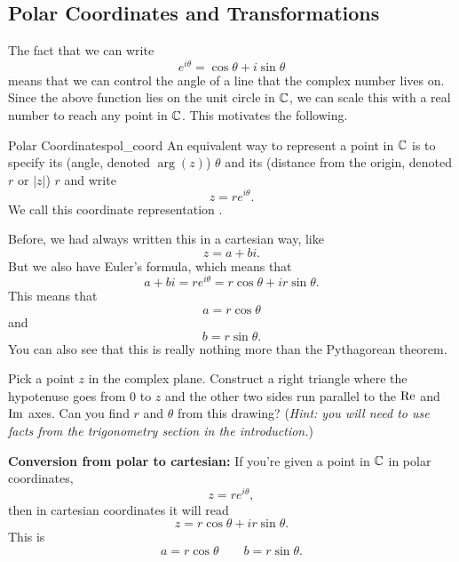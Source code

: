         \subsection{Polar Coordinates and Transformations}
        The fact that we can write
        \[
        e^{i\theta}= \cos \theta + i \sin \theta
        \]
        means that we can control the angle of a line that the complex number lives on.  Since the above function lies on the unit circle in $\mathbb{C}$, we can scale this with a real number to reach any point in $\mathbb{C}$. This motivates the following.
        
        \begin{df}{Polar Coordinates}{pol_coord}
        An equivalent way to represent a point in $\mathbb{C}$ is to specify its  (angle, denoted $\arg(z)$) $\theta$ and its  (distance from the origin, denoted $r$ or $|z|$) $r$ and write
        \[
        z=re^{i\theta}.
        \]
        We call this coordinate representation . 
        \end{df}
        
        Before, we had always written this in a cartesian way, like
        \[
        z=a+bi.
        \]
        But we also have Euler's formula, which means that
        \[
        a+bi = re^{i\theta} = r\cos \theta + i r \sin \theta.
        \]
        This means that
        \[
        a=r\cos \theta
        \]
        and 
        \[
        b = r \sin \theta.
        \]
        You can also see that this is really nothing more than the Pythagorean theorem.
        
        \begin{exercise}
            Pick a point $z$ in the complex plane. Construct a right triangle where the hypotenuse goes from $0$ to $z$ and the other two sides run parallel to the $\mathrm{Re}$ and $\mathrm{Im}$ axes. Can you find $r$ and $\theta$ from this drawing? (\emph{Hint: you will need to use facts from the trigonometry section in the introduction.})
        \end{exercise}
        
        
        
        \noindent \textbf{\textbf{Conversion from polar to cartesian:}} If you're given a point in $\mathbb{C}$ in polar coordinates,
        \[
        z=re^{i\theta},
        \]
        then in cartesian coordinates it will read
        \[
        z=r\cos \theta + ir\sin \theta.
        \]
        This is
        \[
        a=r\cos \theta \qquad b=r\sin \theta.
        \]
        
